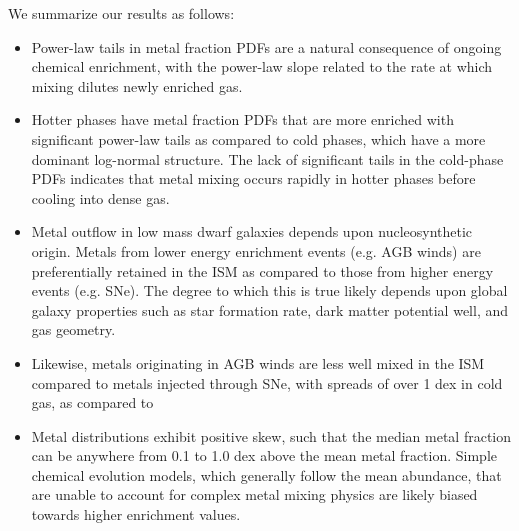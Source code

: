 \documentclass[twocolumn]{aastex61}
\begin{document}
We summarize our results as follows:
\begin{itemize}



\item Power-law tails in metal fraction PDFs are a natural consequence of ongoing chemical enrichment, with the power-law slope related to the rate at which mixing dilutes newly enriched gas. 

\item Hotter phases have metal fraction PDFs that are more enriched with significant power-law tails as compared to cold phases, which have a more dominant log-normal structure. The lack of significant tails in the cold-phase PDFs indicates that metal mixing occurs rapidly in hotter phases before cooling into dense gas. %

\item Metal outflow in low mass dwarf galaxies depends upon nucleosynthetic origin. Metals from lower energy enrichment events (e.g. AGB winds) are preferentially retained in the ISM as compared to those from higher energy events (e.g. SNe). The degree to which this is true likely depends upon global galaxy properties such as star formation rate, dark matter potential well, and gas geometry.

\item Likewise, metals originating in AGB winds are less well mixed in the ISM compared to metals injected through SNe, with spreads of over 1 dex in cold gas, as compared to 

\item Metal distributions exhibit positive skew, such that the median metal fraction can be anywhere from 0.1 to 1.0 dex above the mean metal fraction. Simple chemical evolution models, which generally follow the mean abundance, that are unable to account for complex metal mixing physics are likely biased towards higher enrichment values.


\end{itemize}
\end{document}
